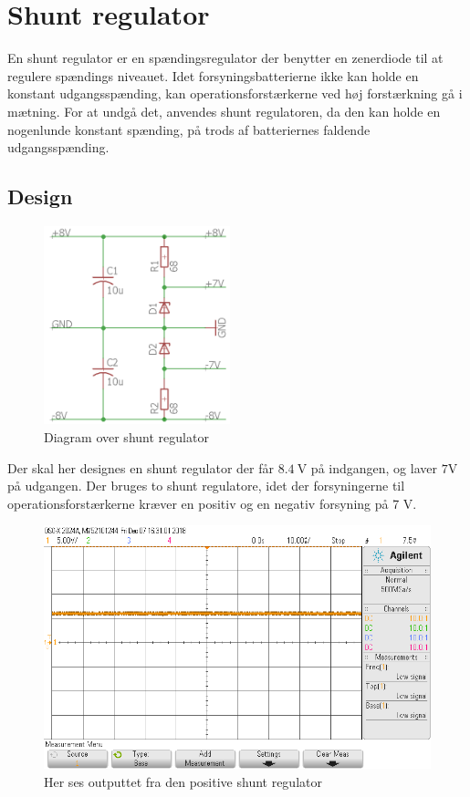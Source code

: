 \section{Shunt regulator}\label{sec:shunt}
En shunt regulator er en spændingsregulator der benytter en zenerdiode til at regulere spændings niveauet.
Idet forsyningsbatterierne ikke kan holde en konstant udgangsspænding, kan operationsforstærkerne ved høj forstærkning gå i mætning. 
For at undgå det, anvendes shunt regulatoren, da den kan holde en nogenlunde konstant spænding, på trods af batteriernes faldende udgangsspænding.

\subsection{Design}
\begin{figure}
	\centering
	\includegraphics[width=0.48\textwidth]{billeder/shunt_regulator.png}
	\caption{Diagram over shunt regulator}
	\label{fig:ActiveFilter}
\end{figure}
Der skal her designes en shunt regulator der får $\SI{8.4}{\volt}$ på indgangen, og laver $7\si{\volt}$ på udgangen.
Der bruges to shunt regulatore, idet der forsyningerne til operationsforstærkerne kræver en positiv og en negativ forsyning på 7 \si{\volt}.

\begin{figure}[h!]
	\centering
	\includegraphics[width=1\textwidth]{billeder/shunt_pos_png.png}
	\caption{Her ses outputtet fra den positive shunt regulator}
	\label{fig:positiv_shunt}
\end{figure}
